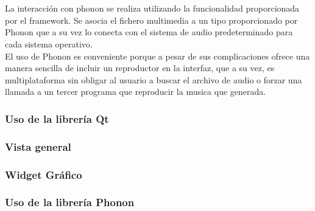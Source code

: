 \newline
\\
\\La interacción con phonon se realiza utilizando la funcionalidad proporcionada por el framework. Se asocia el fichero multimedia a un tipo proporcionado por Phonon que a su vez lo conecta con el sistema de audio predeterminado para cada sistema operativo.
\\El uso de Phonon es conveniente porque a pesar de sus complicaciones ofrece una manera sencilla de incluir un reproductor en la interfaz, que a su vez, es multiplataforma sin obligar al usuario a buscar el archivo de audio o forzar una llamada a un tercer programa que reproducir la musica que generada.

\subsubsection{Uso de la librería Qt}

\subsubsection{Vista general}

\subsubsection{Widget Gráfico}

\subsubsection{Uso de la librería Phonon}